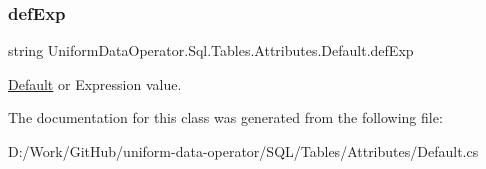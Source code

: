 \subsubsection{\texorpdfstring{def\+Exp}{defExp}}
{\footnotesize\ttfamily string Uniform\+Data\+Operator.\+Sql.\+Tables.\+Attributes.\+Default.\+def\+Exp}



\mbox{\hyperlink{class_uniform_data_operator_1_1_sql_1_1_tables_1_1_attributes_1_1_default}{Default}} or Expression value. 



The documentation for this class was generated from the following file\+:\begin{DoxyCompactItemize}
\item 
D\+:/\+Work/\+Git\+Hub/uniform-\/data-\/operator/\+S\+Q\+L/\+Tables/\+Attributes/Default.\+cs\end{DoxyCompactItemize}
